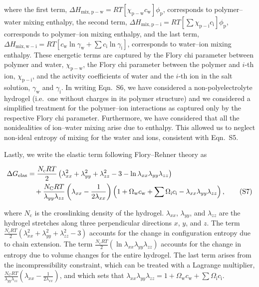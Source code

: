 \documentclass[11pt]{article}
\begin{document}
where the first term, $\Delta H_\mathrm{mix,p-w} = RT\left[\chi_\mathrm{p-w} c_\mathrm{w}\right]\phi_\mathrm{p}$, corresponds to polymer--water mixing enthalpy, the second term, $\Delta H_\mathrm{mix,p-i} = RT\left[\sum \chi_\mathrm{p-i} c_\mathrm{i}\right]\phi_\mathrm{p}$, corresponds to polymer--ion mixing enthalpy, and the last term, $\Delta H_\mathrm{mix,w-i} = RT\left[c_\mathrm{w} \ln \gamma_\mathrm{w} + \sum c_\mathrm{i} \ln \gamma_\mathrm{i}\right]$, corresponds to water--ion mixing enthalpy. These energetic terms are captured by the Flory chi parameter between polymer and water, $\chi_\mathrm{p-w}$,\cite{flory1953} the Flory chi parameter between the polymer and $i$-th ion, $\chi_\mathrm{p-i}$,\cite{chen2022} and the activity coefficients of water and the $i$-th ion in the salt solution, $\gamma_\mathrm{w}$ and $\gamma_\mathrm{i}$.\cite{atkins2006} In writing Eqn.~S6, we have considered a non-polyelectrolyte hydrogel (i.e.\ one without charges in its polymer structure) and we considered a simplified treatment for the polymer--ion interactions as captured only by the respective Flory chi parameter.\cite{chen2022} Furthermore, we have considered that all the nonidealities of ion--water mixing arise due to enthalpy. This allowed us to neglect non-ideal entropy of mixing for the water and ions, consistent with Eqn.~S5.

Lastly, we write the elastic term following Flory--Rehner theory as\cite{rubinstein2003,bouklas2012}

\begin{align}
\Delta G_\mathrm{elas} &= \frac{N_\mathrm{c} RT}{2}\left(\lambda_{xx}^2 + \lambda_{yy}^2 + \lambda_{zz}^2 - 3 - \ln \lambda_{xx}\lambda_{yy}\lambda_{zz}\right) \notag\\
&\quad + \frac{N_\mathrm{C} RT}{\lambda_{yy}\lambda_{zz}}\left(\lambda_{xx} - \frac{1}{2\lambda_{xx}}\right)\left(1 + \Omega_\mathrm{w} c_\mathrm{w} + \sum \Omega_\mathrm{i} c_\mathrm{i} - \lambda_{xx}\lambda_{yy}\lambda_{zz}\right), \tag{S7}
\end{align}

where $N_\mathrm{c}$ is the crosslinking density of the hydrogel. $\lambda_{xx}$, $\lambda_{yy}$, and $\lambda_{zz}$ are the hydrogel stretches along three perpendicular directions $x$, $y$, and $z$. The term $\frac{N_\mathrm{c} RT}{2}\left(\lambda_{xx}^2 + \lambda_{yy}^2 + \lambda_{zz}^2 - 3\right)$ accounts for the change in configuration entropy due to chain extension. The term $\frac{N_\mathrm{c} RT}{2}\left(\ln \lambda_{xx}\lambda_{yy}\lambda_{zz}\right)$ accounts for the change in entropy due to volume changes for the entire hydrogel. The last term arises from the incompressibility constraint, which can be treated with a Lagrange multiplier, $\frac{N_\mathrm{C} RT}{\lambda_{yy}\lambda_{zz}}\left(\lambda_{xx} - \frac{1}{2\lambda_{xx}}\right)$, and which sets that $\lambda_{xx}\lambda_{yy}\lambda_{zz} = 1 + \Omega_\mathrm{w} c_\mathrm{w} + \sum \Omega_\mathrm{i} c_\mathrm{i}$.\cite{bouklas2012}
\end{document}
